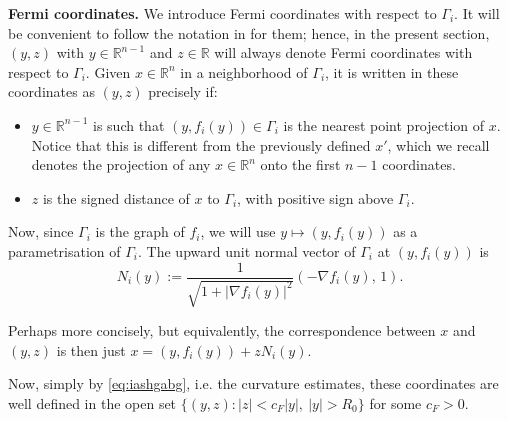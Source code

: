 \documentclass{article}
\newcommand{\R}{\mathbb{R}}
\theoremstyle{definition}
\begin{document}
{\bf Fermi coordinates.} We introduce Fermi coordinates with respect to \(\Gamma_i\). It will be convenient to follow the notation in \cite{WW19} for them; hence, in the present section, \((y, z)\) with $y\in\R^{n-1}$ and $z\in\R$ will always denote Fermi coordinates with respect to \(\Gamma_i\). Given \(x\in\R^n\) in a neighborhood of \(\Gamma_i\), it is written in these coordinates as \((y, z)\) precisely if:
\begin{itemize}
    \item $y\in\R^{n-1}$ is such that \((y, f_i(y)) \in \Gamma_i\) is the nearest point projection of \(x\). Notice that this is different from the previously defined $x'$, which we recall denotes the projection of any $x\in\R^n$ onto the first $n-1$ coordinates.
    \item \(z\) is the signed distance of \(x\) to \(\Gamma_i\), with positive sign above \(\Gamma_i\).
\end{itemize}
Now, since \(\Gamma_i\) is the graph of \(f_i\), we will use \(y \mapsto (y, f_i(y))\) as a parametrisation of \(\Gamma_i\). The upward unit normal vector of \(\Gamma_i\) at \((y, f_i(y))\) is
$$
N_i(y) := \frac{1}{\sqrt{1 + |\nabla f_i(y)|^2}} \left(-\nabla f_i(y),\, 1 \right).
$$


Perhaps more concisely, but equivalently, the correspondence between $x$ and $(y,z)$ is then just $x=(y, f_i(y))+zN_i(y)$.

Now, simply by \eqref{eq:iashgabg}, i.e. the curvature estimates, these coordinates are well defined in the open set \(\{(y, z) : |z| < c_F |y|,\ |y| > R_0\}\) for some \(c_F > 0\).
\end{document}
